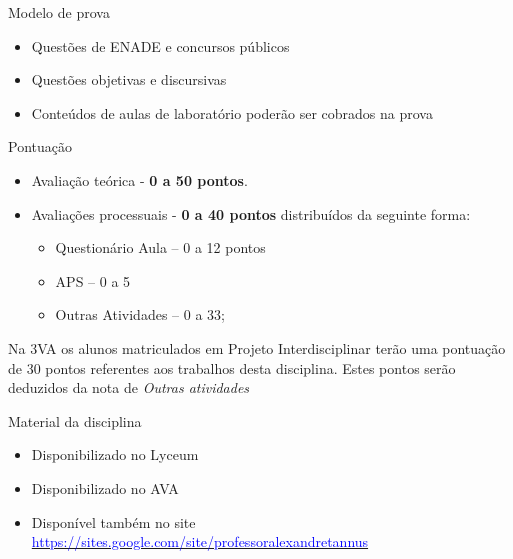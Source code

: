 \documentclass[aspectratio=169,
				xcolor=table]{beamer}
\begin{document}
	\begin{frame}{Modelo de prova}
		\begin{itemize}
			\item Questões de ENADE e concursos públicos
			\vspace{1em}
			\item Questões objetivas e discursivas
			\vspace{1em}
			\item Conteúdos de aulas de laboratório poderão ser cobrados na prova
		\end{itemize}
	\end{frame}
	
	\begin{frame}{Pontuação}
	
		\begin{itemize}
			\item Avaliação teórica - \textbf{0 a 50 pontos}.
			\vspace{1em}
			\item Avaliações processuais - \textbf{0 a 40 pontos} distribuídos da seguinte forma:
			\begin{itemize}
				\item Questionário Aula – 0 a 12 pontos
				\item APS – 0 a 5
				\item Outras Atividades – 0 a 33;
			\end{itemize}
		\end{itemize}
		
		Na 3VA os alunos matriculados em Projeto Interdisciplinar terão uma pontuação de 30 pontos referentes aos trabalhos desta disciplina. Estes pontos serão deduzidos da nota de \textit{Outras atividades}
	\end{frame}
	
	\begin{frame}{Material da disciplina}
		\begin{itemize}
			\item Disponibilizado no Lyceum
			\vspace{1em}
			\item Disponibilizado no AVA
			\vspace{1em}
			\item Disponível também no site \href{https://sites.google.com/site/professoralexandretannus}{\textcolor{blue}{https://sites.google.com/site/professoralexandretannus}}  
		\end{itemize}
	\end{frame}
	
\end{document}
